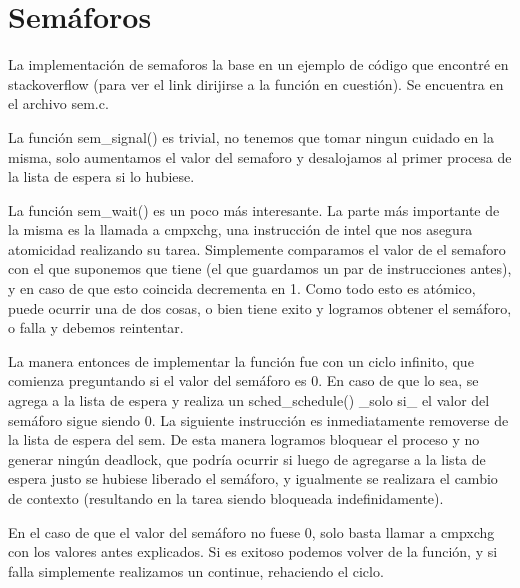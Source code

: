 \section{Semáforos}

La implementación de semaforos la base en un ejemplo de código que encontré en
stackoverflow (para ver el link dirijirse a la función en cuestión). Se
encuentra en el archivo sem.c.

La función sem\_signal() es trivial, no tenemos que tomar ningun cuidado en la
misma, solo aumentamos el valor del semaforo y desalojamos al primer procesa de
la lista de espera si lo hubiese.

La función sem\_wait() es un poco más interesante. La parte más importante de
la misma es la llamada a cmpxchg, una instrucción de intel que nos asegura
atomicidad realizando su tarea. Simplemente comparamos el valor de el semaforo
con el que suponemos que tiene (el que guardamos un par de instrucciones
antes), y en caso de que esto coincida decrementa en 1. Como todo esto es
atómico, puede ocurrir una de dos cosas, o bien tiene exito y logramos obtener
el semáforo, o falla y debemos reintentar.

La manera entonces de implementar la función fue con un ciclo infinito, que
comienza preguntando si el valor del semáforo es 0. En caso de que lo sea, se
agrega a la lista de espera y realiza un sched\_schedule() \_solo si\_ el valor
del semáforo sigue siendo 0. La siguiente instrucción es inmediatamente
removerse de la lista de espera del sem. De esta manera logramos bloquear el
proceso y no generar ningún deadlock, que podría ocurrir si luego de agregarse
a la lista de espera justo se hubiese liberado el semáforo, y igualmente se
realizara el cambio de contexto (resultando en la tarea siendo bloqueada
indefinidamente).

En el caso de que el valor del semáforo no fuese 0, solo basta llamar a cmpxchg
con los valores antes explicados. Si es exitoso podemos volver de la función, y
si falla simplemente realizamos un continue, rehaciendo el ciclo.
